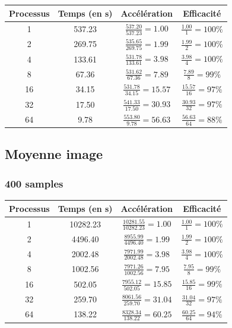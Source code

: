 \documentclass{article}
\begin{document}
\begin{tabular}{ | c | c | c | c |}
  \hline
  Processus & Temps (en s) & Accélération & Efficacité \\
  \hline
  1 & 537.23 & $\frac{537.20}{537.23} = 1.00 $ & $ \frac{1.00}{1} = 100\% $ \\
  2 & 269.75 & $\frac{535.65}{269.75} = 1.99 $ & $ \frac{1.99}{2} = 100\% $ \\
  4 & 133.61 & $\frac{531.78}{133.61} = 3.98 $ & $ \frac{3.98}{4} = 100\% $ \\
  8 & 67.36 & $\frac{531.62}{67.36} = 7.89 $ & $ \frac{7.89}{8} = 99\% $ \\
  16 & 34.15 & $\frac{531.78}{34.15} = 15.57 $ & $ \frac{15.57}{16} = 97\% $ \\
  32 & 17.50 & $\frac{541.33}{17.50} = 30.93 $ & $ \frac{30.93}{32} = 97\% $ \\
  64 & 9.78 & $\frac{553.80}{9.78} = 56.63 $ & $ \frac{56.63}{64} = 88\% $ \\
  \hline
\end{tabular}

\subsection{Moyenne image}

\subsubsection{400 samples}

\begin{tabular}{ | c | c | c | c |}
  \hline
  Processus & Temps (en s) & Accélération & Efficacité \\
  \hline
  1 & 10282.23 & $\frac{10281.55}{10282.23} = 1.00 $ & $ \frac{1.00}{1} = 100\% $ \\
  2 & 4496.40 & $\frac{8955.99}{4496.40} = 1.99 $ & $ \frac{1.99}{2} = 100\% $ \\
  4 & 2002.48 & $\frac{7971.99}{2002.48} = 3.98 $ & $ \frac{3.98}{4} = 100\% $ \\
  8 & 1002.56 & $\frac{7971.26}{1002.56} = 7.95 $ & $ \frac{7.95}{8} = 99\% $ \\
  16 & 502.05 & $\frac{7955.12}{502.05} = 15.85 $ & $ \frac{15.85}{16} = 99\% $ \\
  32 & 259.70 & $\frac{8061.56}{259.70} = 31.04 $ & $ \frac{31.04}{32} = 97\% $ \\
  64 & 138.22 & $\frac{8328.34}{138.22} = 60.25 $ & $ \frac{60.25}{64} = 94\% $ \\
  \hline
\end{tabular}
\end{document}
